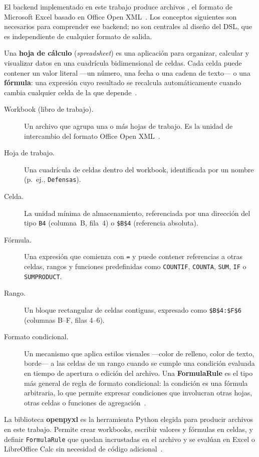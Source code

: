 El backend implementado en este trabajo produce archivos \xlsx{}, el formato
de Microsoft Excel basado en Office Open XML~\cite{ooxml}.  Los conceptos
siguientes son necesarios para comprender ese backend; no son centrales al
diseño del DSL, que es independiente de cualquier formato de salida.

Una \textbf{hoja de cálculo} (\textit{spreadsheet}) es una aplicación para
organizar, calcular y visualizar datos en una cuadrícula bidimensional de
celdas.  Cada celda puede contener un valor literal ---un número, una fecha
o una cadena de texto--- o una \textbf{fórmula}: una expresión cuyo
resultado se recalcula automáticamente cuando cambia cualquier celda de la
que depende~\cite{microsoft-excel}.

\begin{description}
  \item[Workbook (libro de trabajo).] Un archivo \xlsx{} que agrupa una
    o más hojas de trabajo.  Es la unidad de intercambio del formato
    Office Open XML~\cite{ooxml}.

  \item[Hoja de trabajo.] Una cuadrícula de celdas dentro del workbook,
    identificada por un nombre (p.~ej., \texttt{Defensas}).

  \item[Celda.] La unidad mínima de almacenamiento, referenciada por
    una dirección del tipo \texttt{B4} (columna~B, fila~4) o
    \texttt{\$B\$4} (referencia absoluta).

  \item[F\'ormula.] Una expresión que comienza con \texttt{=} y puede
    contener referencias a otras celdas, rangos y funciones predefinidas
    como \texttt{COUNTIF}, \texttt{COUNTA}, \texttt{SUM}, \texttt{IF} o
    \texttt{SUMPRODUCT}.

  \item[Rango.] Un bloque rectangular de celdas contiguas, expresado como
    \texttt{\$B\$4:\$F\$6} (columnas B--F, filas 4--6).

  \item[Formato condicional.] Un mecanismo que aplica estilos visuales
    ---color de relleno, color de texto, borde--- a las celdas de un rango
    cuando se cumple una condición evaluada en tiempo de apertura o edición
    del archivo.  Una \textbf{FormulaRule} es el tipo más general de regla
    de formato condicional: la condición es una fórmula arbitraria, lo que
    permite expresar condiciones que involucran otras hojas, otras celdas
    o funciones de agregación~\cite{openpyxl}.
\end{description}

La biblioteca \textbf{openpyxl} es la herramienta Python elegida para
producir archivos \xlsx{} en este trabajo.  Permite crear workbooks, escribir
valores y fórmulas en celdas, y definir \texttt{FormulaRule} que quedan
incrustadas en el archivo y se evalúan en Excel o LibreOffice Calc sin
necesidad de código adicional~\cite{openpyxl}.
